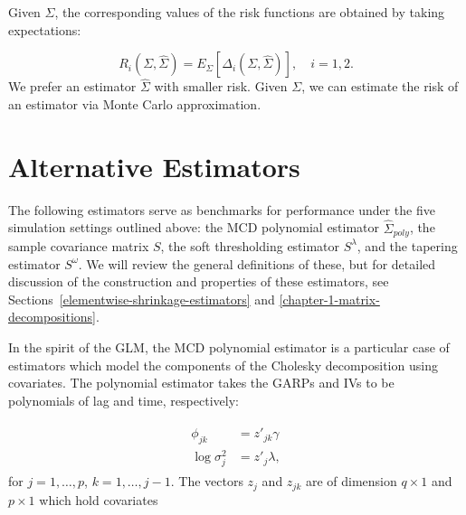 \bigskip

Given $\Sigma$, the corresponding values of the risk functions are obtained by taking expectations:

\begin{equation*}
R_i \left(\Sigma,\hat{\Sigma}\right) = E_\Sigma\left[\Delta_i\left(\Sigma,\hat{\Sigma}\right)\right], \quad i = 1,2.
\end{equation*}
\noindent
We prefer an estimator $\hat{\Sigma}$ with smaller risk.  Given $\Sigma$, we can estimate the risk of an estimator via Monte Carlo approximation. 


\section{Alternative Estimators}
%
The following estimators serve as benchmarks for performance under the five simulation settings outlined above: the MCD polynomial estimator $\hat{\Sigma}_{poly}$, the sample covariance matrix $S$, the soft thresholding estimator $S^\lambda$, and the tapering estimator $S^\omega$. We will review the general definitions of these, but for detailed discussion of the construction and properties of these estimators, see Sections~\ref{elementwise-shrinkage-estimators} and \ref{chapter-1-matrix-decompositions}.

\bigskip

In the spirit of the GLM, the MCD polynomial estimator is a particular case of estimators which model the components of the Cholesky decomposition using covariates. The polynomial estimator takes the GARPs and IVs to be polynomials of lag and time, respectively:

\begin{align*}
\begin{split}  \label{eq:GARP-IV-parametric-model}
\phi_{jk} &= z'_{jk} \gamma \\
\log \sigma^2_{j} &= z'_{j}\lambda, 
\end{split}
\end{align*}
\noindent
for $j = 1,\dots, p$, $k = 1,\dots, j-1$. The vectors $z_j$ and $z_{jk}$ are of dimension $q \times 1$ and $p \times 1$  which hold covariates


